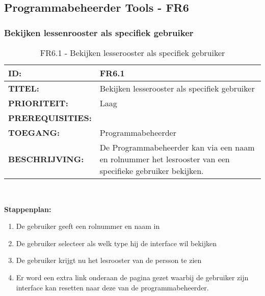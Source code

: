\subsection{Programmabeheerder Tools - FR6}

\subsubsection{Bekijken lessenrooster als specifiek gebruiker}
\noindent\begin{table}[H]
            \begin{tabular}{l | p{10cm}}
                \textbf{ID:} & FR6.1 \\ \hline
                \textbf{TITEL:} & Bekijken lesserooster als specifiek gebruiker\\ \hline
                \textbf{PRIORITEIT:} &  Laag \\ \hline
                \textbf{PREREQUISITIES:} & \\ \hline
                \textbf{TOEGANG:} & Programmabeheerder \\ \hline
                \textbf{BESCHRIJVING:} & De Programmabeheerder kan via een naam en rolnummer het lesrooster van een specifieke gebruiker bekijken. \\ 
            \end{tabular}\\
            \caption{FR6.1 - Bekijken lesserooster als specifiek gebruiker}
            \label{tab:FR6.1 - Bekijken lesserooster als specifiek gebruiker}
        \end{table}
        
\textbf{Stappenplan:}
	\begin{enumerate}
	\item De gebruiker geeft een rolnummer en naam in
	\item De gebruiker selecteer als welk type hij de interface wil bekijken
	\item De gebruiker krijgt nu het lesrooster van de persson te zien
	\item Er word een extra link onderaan de pagina gezet waarbij de gebruiker zijn interface kan resetten naar deze van de programmabeheerder.
	\end{enumerate}
        
